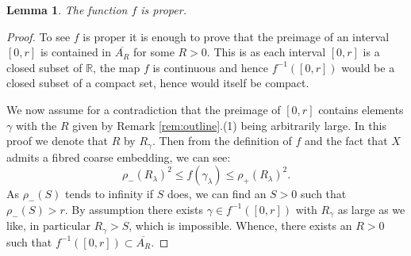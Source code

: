 \documentclass[preprint]{elsarticle}
\theoremstyle{plain}
\newtheorem{lemma}[theorem]{Lemma}%
\theoremstyle{definition}%
\theoremstyle{remark}%
\begin{document}
\begin{lemma}\label{lem:MT1-a}
The function $f$ is proper.
\end{lemma}
\begin{proof}
To see $f$ is proper it is enough to prove that the preimage of an interval $[0,r]$ is contained in $\overline{A_{R}}$ for some $R>0$. This is as each interval $[0,r]$ is a closed subset of $\mathbb{R}$, the map $f$ is continuous and hence $f^{-1}([0,r])$ would be a closed subset of a compact set, hence would itself be compact.

We now assume for a contradiction that the preimage of $[0,r]$ contains elements $\gamma$ with the $R$ given by Remark \ref{rem:outline}.(1) being arbitrarily large. In this proof we denote that $R$ by $R_{\gamma}$. Then from the definition of $f$ and the fact that $X$ admits a fibred coarse embedding, we can see:
\begin{equation*}
\rho_{-}(R_{\lambda})^{2} \leq f(\gamma_{\lambda}) \leq \rho_{+}(R_{\lambda})^{2}.
\end{equation*}
As $\rho_{-}(S)$ tends to infinity if $S$ does, we can find an $S>0$ such that $\rho_{-}(S)>r$. By assumption there exists $\gamma \in f^{-1}([0,r])$ with $R_{\gamma}$ as large as we like, in particular $R_{\gamma}>S$, which is impossible. Whence, there exists an $R>0$ such that $f^{-1}([0,r]) \subset \overline{A_{R}}$.
\end{proof}
\end{document}
